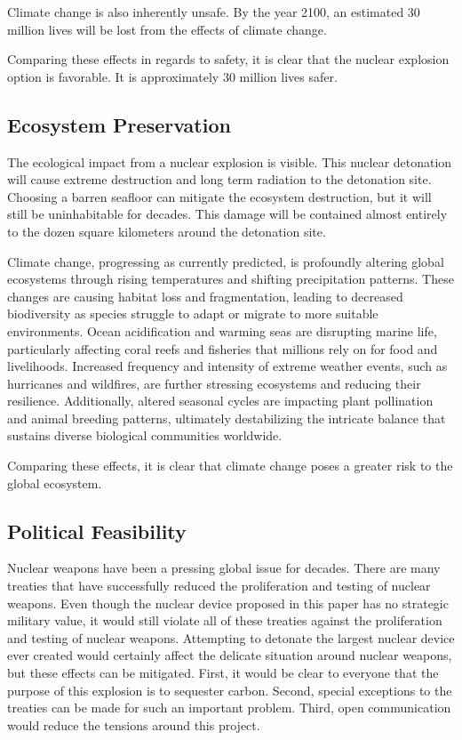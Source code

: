 \documentclass[11pt]{article}
\begin{document}
Climate change is also inherently unsafe. By the year 2100, an estimated 30 million lives will be lost from the effects of climate change\citep{climate_change_kill_millions}.


Comparing these effects in regards to safety, it is clear that the nuclear explosion option is favorable. It is approximately 30 million lives safer.



\subsection{Ecosystem Preservation}
The ecological impact from a nuclear explosion is visible. This nuclear detonation will cause extreme destruction and long term radiation to the detonation site. Choosing a barren seafloor can mitigate the ecosystem destruction, but it will still be uninhabitable for decades. This damage will be contained almost entirely to the dozen square kilometers around the detonation site.


Climate change, progressing as currently predicted, is profoundly altering global ecosystems through rising temperatures and shifting precipitation patterns. These changes are causing habitat loss and fragmentation, leading to decreased biodiversity as species struggle to adapt or migrate to more suitable environments. Ocean acidification and warming seas are disrupting marine life, particularly affecting coral reefs and fisheries that millions rely on for food and livelihoods. Increased frequency and intensity of extreme weather events, such as hurricanes and wildfires, are further stressing ecosystems and reducing their resilience. Additionally, altered seasonal cycles are impacting plant pollination and animal breeding patterns, ultimately destabilizing the intricate balance that sustains diverse biological communities worldwide.



Comparing these effects, it is clear that climate change poses a greater risk to the global ecosystem.


\subsection{Political Feasibility}
Nuclear weapons have been a pressing global issue for decades. There are many treaties that have successfully reduced the proliferation and testing of nuclear weapons. Even though the nuclear device proposed in this paper has no strategic military value, it would still violate all of these treaties against the proliferation and testing of nuclear weapons. Attempting to detonate the largest nuclear device ever created would certainly affect the delicate situation around nuclear weapons, but these effects can be mitigated. First, it would be clear to everyone that the purpose of this explosion is to sequester carbon. Second, special exceptions to the treaties can be made for such an important problem. Third, open communication would reduce the tensions around this project.
\end{document}
